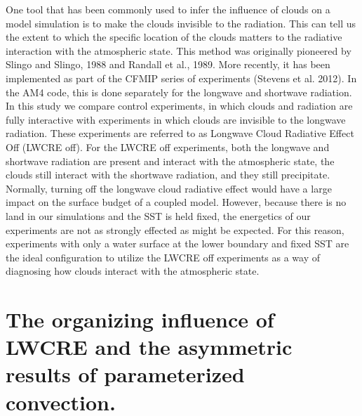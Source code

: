 \documentclass[11pt]{article}   	%
\begin{document}
One tool that has been commonly used to infer the influence of clouds on a model simulation is to make the clouds invisible to the 
radiation.  This can tell us the extent to which the specific location of the clouds matters to the radiative interaction with the 
atmospheric state.   This method was originally pioneered by Slingo and Slingo, 1988 and Randall et al., 1989.  More recently, it has been
implemented as part of the CFMIP series of experiments (Stevens et al. 2012).
In the AM4 code, this is done separately for the longwave and shortwave radiation.  In this study we compare control experiments, 
in which clouds and radiation are fully interactive with experiments in which clouds are invisible to the longwave radiation.  These 
experiments are referred to as Longwave Cloud Radiative Effect Off (LWCRE off).  
For the LWCRE off experiments, both the longwave and shortwave radiation are present and interact with 
the atmospheric state, the clouds still interact with the shortwave radiation, and they still precipitate.   
Normally, turning off the longwave cloud radiative effect would have a large impact on the surface budget of a coupled model.  
However, because there is no land in our simulations and the SST is held fixed, the energetics of our experiments are not as
strongly effected as might be expected.  For this reason, experiments with only a water surface at the lower boundary and 
fixed SST are the ideal configuration to utilize the LWCRE off experiments as a way of diagnosing how clouds interact with 
the atmospheric state.  

\section{The organizing influence of LWCRE and the asymmetric results of parameterized convection.}
\end{document}
